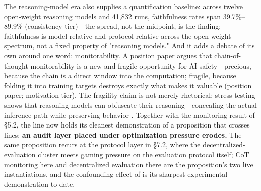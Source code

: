\documentclass[11pt,a4paper]{article}
\begin{document}
The reasoning-model era also supplies a quantification baseline: across twelve open-weight reasoning models and 41,832 runs, faithfulness rates span 39.7\%–89.9\% \cite{key32} (consistency tier)—the spread, not the midpoint, is the finding: faithfulness is model-relative and protocol-relative across the open-weight spectrum, not a fixed property of "reasoning models." And it adds a debate of its own around one word: monitorability. A position paper argues that chain-of-thought monitorability is a new and fragile opportunity for AI safety—precious, because the chain is a direct window into the computation; fragile, because folding it into training targets destroys exactly what makes it valuable \cite{key33} (position paper; motivation tier). The fragility claim is not merely rhetorical: stress-testing shows that reasoning models can obfuscate their reasoning—concealing the actual inference path while preserving behavior \cite{key34}. Together with the monitoring result of §5.2, the line now holds its cleanest demonstration of a proposition that crosses lines: \textbf{an audit layer placed under optimization pressure erodes.} The same proposition recurs at the protocol layer in §7.2, where the decentralized-evaluation cluster meets gaming pressure on the evaluation protocol itself; CoT monitoring here and decentralized evaluation there are the proposition's two live instantiations, and the confounding effect of \cite{key30} is its sharpest experimental demonstration to date.
\end{document}
